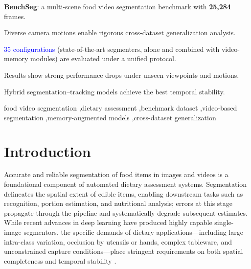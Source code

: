 \documentclass[preprint,12pt]{elsarticle}
\newcommand{\change}[1]{\textcolor{blue}{#1}}
\begin{document}
\begin{frontmatter}
\begin{highlights}
    \item \textbf{BenchSeg}: a multi-scene food video segmentation benchmark with \textbf{25,284} frames.
    \item Diverse camera motions enable rigorous cross-dataset generalization analysis.
    \item \change{$35$ configurations} (state-of-the-art segmenters, alone and combined with video-memory modules) are evaluated under a unified protocol.
    \item Results show strong performance drops under unseen viewpoints and motions.
    \item Hybrid segmentation–tracking models achieve the best temporal stability.
\end{highlights}



\begin{keyword}

food video segmentation \sep dietary assessment \sep benchmark dataset \sep video-based segmentation \sep memory-augmented models \sep cross-dataset generalization



\end{keyword}

\end{frontmatter}

\section{Introduction}
\label{sec:introduction}

Accurate and reliable segmentation of food items in images and videos is a foundational component of automated dietary assessment systems. Segmentation delineates the spatial extent of edible items, enabling downstream tasks such as recognition, portion estimation, and nutritional analysis; errors at this stage propagate through the pipeline and systematically degrade subsequent estimates. While recent advances in deep learning have produced highly capable single-image segmentors, the specific demands of dietary applications—including large intra-class variation, occlusion by utensils or hands, complex tableware, and unconstrained capture conditions—place stringent requirements on both spatial completeness and temporal stability \cite{wu2021large,thames2021nutrition5k}.
\end{document}
